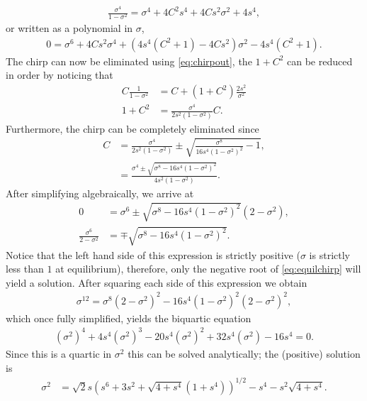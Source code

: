 \begin{align*}
\frac{\sigma^4}{1 - \sigma^2} = \sigma^4 + 4 C^2 s^4 + 4 C s^2 \sigma^2 + 4s^4,
\end{align*}
or written as a polynomial in $\sigma$,
\begin{align*}
0 = \sigma^6 + 4 C s^2 \sigma^4 + \left( 4s^4 (C^2 + 1) - 4 C s^2 \right) \sigma^2 - 4s^4 (C^2 + 1).
\end{align*}
The chirp can now be eliminated using \eqref{eq:chirpout}, the $1+C^2$ can be reduced in order by noticing that
\begin{align*}
C \frac{1}{1 - \sigma^2} &= C + (1 + C^2) \frac{2s^2}{\sigma^2} \\
1 + C^2 &= \frac{\sigma^4}{2s^2(1 - \sigma^2)} C.
\end{align*}
Furthermore, the chirp can be completely eliminated since
\begin{align}
\nonumber
C &= \frac{\sigma^4}{2s^2(1 - \sigma^2)} \pm \sqrt{\frac{\sigma^8}{16s^4(1 - \sigma^2)^2} - 1}, \\
\label{eq:equilchirp}
&= \frac{\sigma^4 \pm \sqrt{\sigma^8 - 16s^4(1 - \sigma^2)^2}}{4s^2(1 - \sigma^2)}.
\end{align}
After simplifying algebraically, we arrive at
\begin{align*}
0 &= \sigma^6 \pm \sqrt{\sigma^8 - 16s^4(1 - \sigma^2)^2}(2 - \sigma^2), \\
\frac{\sigma^6}{2 - \sigma^2} &= \mp \sqrt{\sigma^8 - 16s^4(1 - \sigma^2)^2}.
\end{align*}
Notice that the left hand side of this expression is strictly positive ($\sigma$ is strictly less than $1$ at equilibrium), therefore, only the negative root of \eqref{eq:equilchirp} will yield a solution. After squaring each side of this expression we obtain
\begin{align*}
\sigma^{12} = \sigma^8 (2 - \sigma^2)^2 - 16s^4 (1 - \sigma^2)^2 (2 - \sigma^2)^2,
\end{align*}
which once fully simplified, yields the biquartic equation
\begin{align*}
\left( \sigma^2 \right)^4 + 4 s^4 \left( \sigma^2 \right)^3 - 20 s^4 \left( \sigma^2 \right)^2 + 32 s^4 \left( \sigma^2 \right) - 16 s^4 = 0.
\end{align*}
Since this is a quartic in $\sigma^2$ this can be solved analytically; the (positive) solution is
\begin{align}
\label{eq:equilvar}
\sigma^2 &= \sqrt{2} s \left( s^6 + 3s^2 + \sqrt{4 + s^4}(1 + s^4) \right)^{1/2} - s^4 - s^2 \sqrt{4 + s^4}.
\end{align}

